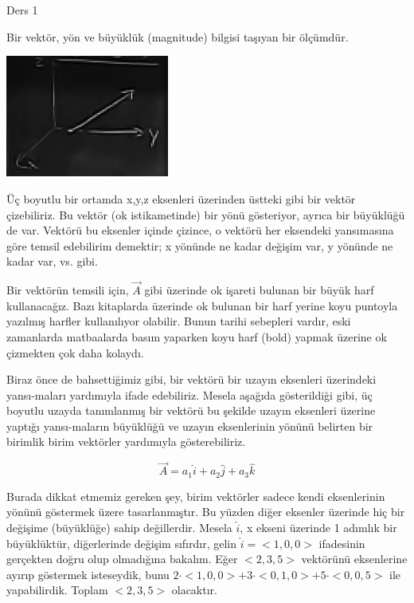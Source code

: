 \documentclass[12pt,fleqn]{article}\usepackage{../../common}
\begin{document}
Ders 1

Bir vektör, yön ve büyüklük (magnitude) bilgisi taşıyan bir ölçümdür.

\begin{center}
\includegraphics[height=4cm]{1_1.png}
\end{center}

Üç boyutlu bir ortamda x,y,z eksenleri üzerinden üstteki gibi bir vektör
çizebiliriz. Bu vektör (ok istikametinde) bir yönü gösteriyor, ayrıca bir
büyüklüğü de var. Vektörü bu eksenler içinde çizince, o vektörü her
eksendeki yansımasına göre temsil edebilirim demektir; x yönünde ne kadar
değişim var, y yönünde ne kadar var, vs. gibi.

Bir vektörün temsili için, $\vec{A}$ gibi üzerinde ok işareti bulunan bir büyük
harf kullanacağız. Bazı kitaplarda üzerinde ok bulunan bir harf yerine koyu
puntoyla yazılmış harfler kullanılıyor olabilir. Bunun tarihi sebepleri vardır,
eski zamanlarda matbaalarda basım yaparken koyu harf (bold) yapmak üzerine ok
çizmekten çok daha kolaydı.

Biraz önce de bahsettiğimiz gibi, bir vektörü bir uzayın eksenleri üzerindeki
yansı-maları yardımıyla ifade edebiliriz. Mesela aşağıda gösterildiği gibi, üç
boyutlu uzayda tanımlanmış bir vektörü bu şekilde uzayın eksenleri üzerine
yaptığı yansı-maların büyüklüğü ve uzayın eksenlerinin yönünü belirten bir
birimlik birim vektörler yardımıyla gösterebiliriz.

$$ \vec{A} = a_1 \hat{i} + a_2 \hat{j} + a_3 \hat{k} $$

Burada dikkat etmemiz gereken şey, birim vektörler sadece kendi eksenlerinin
yönünü göstermek üzere tasarlanmıştır. Bu yüzden diğer eksenler üzerinde hiç bir
değişime (büyüklüğe) sahip değillerdir. Mesela $\hat{i}$, x ekseni üzerinde 1
adımlık bir büyüklüktür, diğerlerinde değişim sıfırdır, gelin $\hat{i} = < 1,0,0 >$
ifadesinin gerçekten doğru olup olmadığına bakalım. Eğer $< 2,3,5 >$
vektörünü eksenlerine ayırıp göstermek isteseydik, bunu $2\cdot< 1,0,0 > +
3\cdot< 0,1,0 > + 5\cdot< 0,0,5 >$ ile yapabilirdik. Toplam $< 2,3,5 >$ olacaktır.
\end{document}
